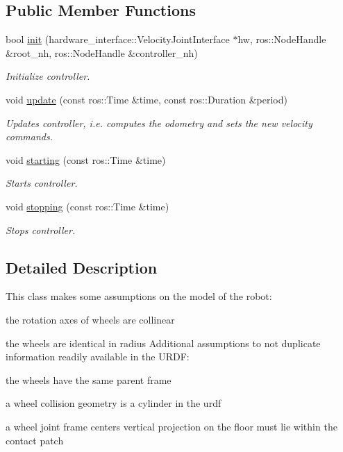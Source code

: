 \subsection*{Public Member Functions}
\begin{DoxyCompactItemize}
\item 
bool \hyperlink{classmecanum__drive__controller_1_1MecanumDriveController_aad81c2f7b52ec97e08d4b102bb577709}{init} (hardware\+\_\+interface\+::\+Velocity\+Joint\+Interface $\ast$hw, ros\+::\+Node\+Handle \&root\+\_\+nh, ros\+::\+Node\+Handle \&controller\+\_\+nh)
\begin{DoxyCompactList}\small\item\em Initialize controller. \end{DoxyCompactList}\item 
void \hyperlink{classmecanum__drive__controller_1_1MecanumDriveController_a458c6c52b997c8b91d44f16e7bc31221}{update} (const ros\+::\+Time \&time, const ros\+::\+Duration \&period)
\begin{DoxyCompactList}\small\item\em Updates controller, i.\+e. computes the odometry and sets the new velocity commands. \end{DoxyCompactList}\item 
void \hyperlink{classmecanum__drive__controller_1_1MecanumDriveController_a0f226fc034ee64d5cc8bc1a0d8237fc6}{starting} (const ros\+::\+Time \&time)
\begin{DoxyCompactList}\small\item\em Starts controller. \end{DoxyCompactList}\item 
void \hyperlink{classmecanum__drive__controller_1_1MecanumDriveController_abf933c790a867ee8cc794ac85386d59c}{stopping} (const ros\+::\+Time \&time)
\begin{DoxyCompactList}\small\item\em Stops controller. \end{DoxyCompactList}\end{DoxyCompactItemize}


\subsection{Detailed Description}
This class makes some assumptions on the model of the robot\+:
\begin{DoxyItemize}
\item the rotation axes of wheels are collinear
\item the wheels are identical in radius Additional assumptions to not duplicate information readily available in the U\+R\+DF\+:
\item the wheels have the same parent frame
\item a wheel collision geometry is a cylinder in the urdf
\item a wheel joint frame center\textquotesingle{}s vertical projection on the floor must lie within the contact patch 
\end{DoxyItemize}

